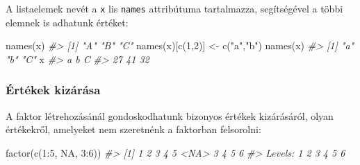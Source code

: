 \documentclass[
]{book}
\newenvironment{Shaded}{\begin{snugshade}}{\end{snugshade}}
\newcommand{\AttributeTok}[1]{\textcolor[rgb]{0.77,0.63,0.00}{#1}}
\newcommand{\CommentTok}[1]{\textcolor[rgb]{0.56,0.35,0.01}{\textit{#1}}}
\newcommand{\ConstantTok}[1]{\textcolor[rgb]{0.00,0.00,0.00}{#1}}
\newcommand{\DecValTok}[1]{\textcolor[rgb]{0.00,0.00,0.81}{#1}}
\newcommand{\FunctionTok}[1]{\textcolor[rgb]{0.00,0.00,0.00}{#1}}
\newcommand{\NormalTok}[1]{#1}
\newcommand{\OtherTok}[1]{\textcolor[rgb]{0.56,0.35,0.01}{#1}}
\newcommand{\SpecialCharTok}[1]{\textcolor[rgb]{0.00,0.00,0.00}{#1}}
\newcommand{\StringTok}[1]{\textcolor[rgb]{0.31,0.60,0.02}{#1}}
\begin{document}
\begin{Shaded}
\end{Shaded}

A listaelemek nevét a \texttt{x} lis \texttt{names} attribútuma tartalmazza, segítségével a többi elemnek is adhatunk értéket:

\begin{Shaded}
\begin{Highlighting}[]
\FunctionTok{names}\NormalTok{(x)}
\CommentTok{\#\textgreater{} [1] "A" "B" "C"}
\FunctionTok{names}\NormalTok{(x)[}\FunctionTok{c}\NormalTok{(}\DecValTok{1}\NormalTok{,}\DecValTok{2}\NormalTok{)] }\OtherTok{\textless{}{-}} \FunctionTok{c}\NormalTok{(}\StringTok{"a"}\NormalTok{,}\StringTok{"b"}\NormalTok{)}
\FunctionTok{names}\NormalTok{(x)}
\CommentTok{\#\textgreater{} [1] "a" "b" "C"}
\NormalTok{x}
\CommentTok{\#\textgreater{}  a  b  C }
\CommentTok{\#\textgreater{} 27 41 32}
\end{Highlighting}
\end{Shaded}

\hypertarget{uxe9rtuxe9kek-kizuxe1ruxe1sa}{%
\subsubsection{Értékek kizárása}\label{uxe9rtuxe9kek-kizuxe1ruxe1sa}}

A faktor létrehozásánál gondoskodhatunk bizonyos értékek kizárásáról, olyan értékekről, amelyeket nem szeretnénk a faktorban felsorolni:

\begin{Shaded}
\begin{Highlighting}[]
\FunctionTok{factor}\NormalTok{(}\FunctionTok{c}\NormalTok{(}\DecValTok{1}\SpecialCharTok{:}\DecValTok{5}\NormalTok{, }\ConstantTok{NA}\NormalTok{, }\DecValTok{3}\SpecialCharTok{:}\DecValTok{6}\NormalTok{))}
\CommentTok{\#\textgreater{}  [1] 1    2    3    4    5    \textless{}NA\textgreater{} 3    4    5    6   }
\CommentTok{\#\textgreater{} Levels: 1 2 3 4 5 6}
\end{Highlighting}
\end{Shaded}
\end{document}

